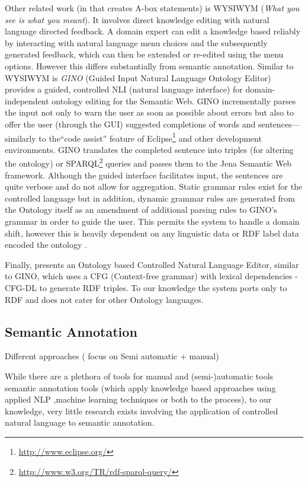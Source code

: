 Other related work (in that creates A-box statements) is WYSIWYM (\textit{What you see is
  what you meant})\cite{Power98}. It involves direct knowledge editing with natural
language directed feedback. A domain expert can edit a knowledge based
reliably by interacting with natural language menu choices and the
subsequently generated feedback, which can then be extended or
re-edited using the menu options. However this differs substantially from semantic annotation.
Similar to WYSIWYM is \emph{GINO} (Guided Input Natural Language Ontology Editor) provides a guided,
controlled NLI (natural language interface) for domain-independent
ontology editing for the Semantic Web. GINO incrementally parses the
input not only to warn the user as soon as possible about errors but
also to offer the user (through the GUI) suggested completions of
words and sentences---similarly to the``code assist'' feature of
Eclipse\footnote{\url{http://www.eclipse.org/}} and other development
environments.  GINO translates the completed sentence into triples
(for altering the ontology) or SPARQL\footnote{\url{http://www.w3.org/TR/rdf-sparql-query/}} queries and
passes them to the Jena Semantic Web framework. Although the guided
interface facilitates input, the sentences are quite verbose and do
not allow for aggregation. Static grammar rules exist for the
controlled language but in addition, dynamic grammar rules are
generated from the Ontology itself as an amendment of additional parsing rules to GINO's grammar in order to guide
the user. This permits the system to handle a domain shift, however
this is heavily dependent on any linguistic data or RDF label data
encoded the ontology \cite{Bernstein06}. 

Finally, \cite{Namgoong07} presents an Ontology based
Controlled Natural Language Editor, similar to GINO, which uses a CFG
(Context-free grammar) with lexical dependencies - CFG-DL to generate
RDF triples.  To our knowledge the system ports only to RDF and does
not cater for other Ontology languages. 
 

\subsection{Semantic Annotation}
Different approaches ( focus on Semi automatic + manual)

While there are a plethora of tools for manual and 
(semi-)automatic tools semantic annotation tools (which apply knowledge based approaches using applied NLP
,machine learning techniques or both to the process), to our knowledge, very little research exists involving the
application of controlled natural language to semantic annotation.

